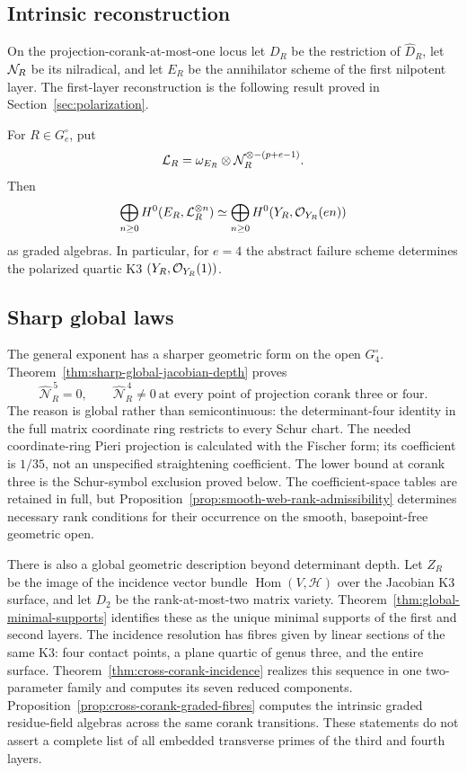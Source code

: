 \subsection{Intrinsic reconstruction}

On the projection-corank-at-most-one locus let \(D_R\) be the
restriction of \(\widehat D_R\), let \(\mathcal N_R\) be its
nilradical, and let \(E_R\) be the annihilator scheme of the first
nilpotent layer.  The first-layer reconstruction is the following result
proved in Section~\ref{sec:polarization}.

\begin{theorem}
\label{thm:main-reconstruction}
For \(R\in G_e^\circ\), put
\[
 \mathcal L_R=\omega_{E_R}\otimes
 \mathcal N_R^{\otimes-(p+e-1)}.
\]
Then
\[
 \bigoplus_{n\ge0}H^0(E_R,\mathcal L_R^{\otimes n})
 \simeq
 \bigoplus_{n\ge0}H^0(Y_R,\mathcal O_{Y_R}(en))
\]
as graded algebras.  In particular, for \(e=4\) the abstract
failure scheme determines the polarized quartic K3
\((Y_R,\mathcal O_{Y_R}(1))\).
\end{theorem}


\subsection{Sharp global laws}

The general exponent has a sharper geometric form on the open
\(G_4^\circ\).  Theorem~\ref{thm:sharp-global-jacobian-depth} proves
\[
 \widehat{\mathcal N}_R^{\,5}=0,
 \qquad \widehat{\mathcal N}_R^{\,4}\ne0
 \ \text{at every point of projection corank three or four}.
\]
The reason is global rather than semicontinuous: the determinant-four
identity in the full matrix coordinate ring restricts to every Schur
chart.  The needed coordinate-ring Pieri projection is calculated with
the Fischer form; its coefficient is \(1/35\), not an unspecified
straightening coefficient.  The lower bound at corank three is the
Schur-symbol exclusion proved below.  The coefficient-space tables
are retained in full, but Proposition~\ref{prop:smooth-web-rank-admissibility}
determines necessary rank conditions for their occurrence on the
smooth, basepoint-free geometric open.

There is also a global geometric description beyond determinant depth.
Let \(Z_R\) be the image of the incidence vector bundle
\(\operatorname{Hom}(V,\mathcal H)\) over the Jacobian K3 surface,
and let \(D_2\) be the rank-at-most-two matrix variety.
Theorem~\ref{thm:global-minimal-supports} identifies these as the
unique minimal supports of the first and second layers.  The incidence
resolution has fibres given by linear sections of the same K3:
four contact points, a plane quartic of genus three, and the entire
surface.  Theorem~\ref{thm:cross-corank-incidence} realizes this
sequence in one two-parameter family and computes its seven reduced
components.  Proposition~\ref{prop:cross-corank-graded-fibres}
computes the intrinsic graded residue-field algebras across the same
corank transitions.  These statements do not assert a complete list
of all embedded transverse primes of the third and fourth layers.

